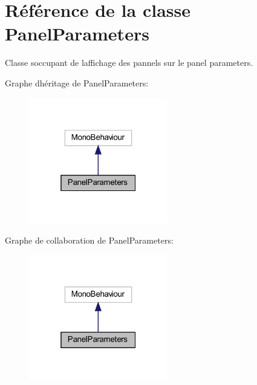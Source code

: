 \hypertarget{class_panel_parameters}{}\section{Référence de la classe Panel\+Parameters}
\label{class_panel_parameters}


Classe s\textquotesingle{}occupant de l\textquotesingle{}affichage des pannels sur le panel parameters.  




Graphe d\textquotesingle{}héritage de Panel\+Parameters\+:\nopagebreak
\begin{figure}[H]
\begin{center}
\leavevmode
\includegraphics[width=172pt]{class_panel_parameters__inherit__graph}
\end{center}
\end{figure}


Graphe de collaboration de Panel\+Parameters\+:\nopagebreak
\begin{figure}[H]
\begin{center}
\leavevmode
\includegraphics[width=172pt]{class_panel_parameters__coll__graph}
\end{center}
\end{figure}

